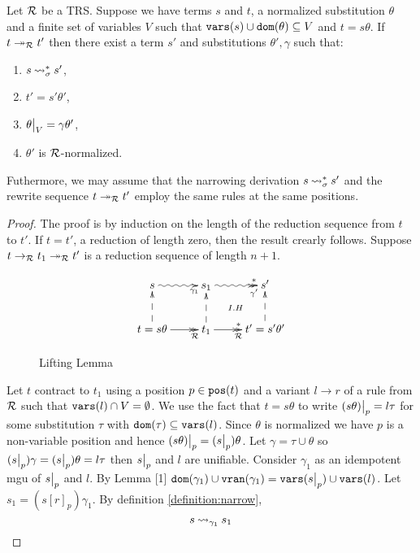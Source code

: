 \begin{lemma}\label{lemma:lifting-lemma-ordinary-narrowing}
	Let $\mathcal{R}$ be a TRS. Suppose we have terms $s$ and $t$, a normalized substitution $\theta$ and a finite set of variables $V$ such that $\mathtt{vars}(s) \cup \mathtt{dom}(\theta) \subseteq V$ and $t = s\theta$. If $t \twoheadrightarrow_{\small{\mathcal{R}}} t'$ then there exist a term $s'$ and substitutions $\theta', \gamma$ such that:
	\begin{enumerate}
		\item $s \mathbin{\rightsquigarrow}^{*}_{\sigma} s'$,
		\item $t' = s'\theta'$,
		\item $\restr{\theta}{V} = \gamma\theta'$,
		\item $\theta'$ is $\mathcal{R}$-normalized.
	\end{enumerate}
	Futhermore, we may assume that the narrowing derivation $s \mathbin{\rightsquigarrow}^{*}_{\sigma} s'$ and the rewrite sequence $t \twoheadrightarrow_{\small{\mathcal{R}}} t'$ employ the same rules at the same positions.

	\begin{proof}
		The proof is by induction on the length of the reduction sequence from $t$ to $t'$. If $t = t'$, a reduction of length zero, then the result crearly follows. Suppose $t \rightarrow_{\small{\mathcal{R}}} t_1 \twoheadrightarrow_{\small{\mathcal{R}}} t'$ is a reduction sequence of length $n+1$.

		\begin{figure}[h!]
			\begin{displaymath}
				\xymatrix{
                    s \ar@{~>}[r]_>>{\gamma_1} & s_1 \ar@{}[dr]|{I.H} \ar@{~>>}[r]_>>{\gamma'}^>>{*} & s' \\
                    t = s\theta \ar@{-->}[u] \ar@{->>}[r]_>>{\trs} & \ar@{-->}[u] t_1 \ar@{->>}[r]_>>{\trs}^>>{*} & t' = s'\theta' \ar@{-->}[u]
				}
			\end{displaymath}
			\caption{Lifting Lemma}
			\label{figure:lifting-lemma}
        \end{figure}

		Let $t$ contract to $t_1$ using a position $p \in \mathtt{pos}(t)$ and a variant $l \rightarrow r$ of a rule from $\mathcal{R}$ such that $\mathtt{vars}(l) \cap V = \emptyset$. We use the fact that $t = s\theta$ to write $\restr{(s\theta)}{p} = l \tau$ for some substitution $\tau$ with $\mathtt{dom}(\tau) \subseteq \mathtt{vars}(l)$. Since $\theta$ is normalized we have $p$ is a non-variable position and hence $\restr{(s\theta)}{p} = (\restr{s}{p})\theta$. Let $\gamma = \tau \cup \theta$ so $(\restr{s}{p})\gamma = (\restr{s}{p})\theta = l \tau$ then $\restr{s}{p}$ and $l$ are unifiable. Consider $\gamma_1$ as an idempotent mgu of $\restr{s}{p}$ and $l$. By Lemma [1] $\dom{\gamma_1} \cup \vran{\gamma_1} = \vars{\restr{s}{p}} \cup \vars{l}$. Let $s_1 = (s[r]_p)\gamma_1$. By definition \ref{definition:narrow},
		\begin{equation}\label{lifting-lemma:eqn:s-narrows-s_1}
			s \mathbin{\rightsquigarrow}_{\gamma_1} s_1
		\end{equation}


\end{proof}
\end{lemma}
